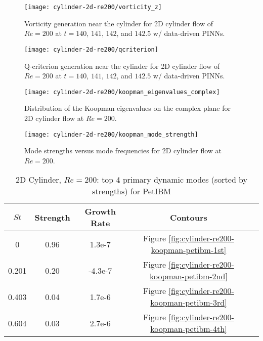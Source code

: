 \begin{figure}[!hbt]
    \centering%
    \texttt{[image: cylinder-2d-re200/vorticity\_z]}%
    \caption{%
        Vorticity generation near the cylinder for 2D cylinder flow of $Re=\num{200}$ at $t=140$, $141$, $142$, and $142.5$ w/ data-driven PINNs.
    }
    \label{fig:cylinder-re200-pinn-vort-gen}%
\end{figure}

\begin{figure}[!hbt]
    \centering%
    \texttt{[image: cylinder-2d-re200/qcriterion]}%
    \caption{%
        Q-criterion generation near the cylinder for 2D cylinder flow of $Re=\num{200}$ at $t=140$, $141$, $142$, and $142.5$ w/ data-driven PINNs.
    }
    \label{fig:cylinder-re200-pinn-qcriterion}%
\end{figure}

\begin{figure}[!hbt]
    \centering%
    \texttt{[image: cylinder-2d-re200/koopman\_eigenvalues\_complex]}%
    \caption{%
        Distribution of the Koopman eigenvalues on the complex plane for 2D cylinder flow at $Re=\num{200}$.
    }
    \label{fig:cylinder-re200-koopman-eig-dist}%
\end{figure}

\begin{figure}[!hbt]
    \centering%
    \texttt{[image: cylinder-2d-re200/koopman\_mode\_strength]}%
    \caption{%
        Mode strengths versus mode frequencies for 2D cylinder flow at $Re=\num{200}$.
    }
    \label{fig:cylinder-re200-koopman-mode-strength}%
\end{figure}

\begin{table}[hbt!]
    \begin{threeparttable}[b]
        \begin{tabular}{ccccc}
            \toprule
            $St$ & Strength & Growth Rate & Contours \\
            \midrule
            0     & 0.96 & 1.3e-7  & Figure \ref{fig:cylinder-re200-koopman-petibm-1st}\\
            0.201 & 0.20 & -4.3e-7 & Figure \ref{fig:cylinder-re200-koopman-petibm-2nd}\\
            0.403 & 0.04 & 1.7e-6  & Figure \ref{fig:cylinder-re200-koopman-petibm-3rd}\\
            0.604 & 0.03 & 2.7e-6  & Figure \ref{fig:cylinder-re200-koopman-petibm-4th}\\
            \bottomrule
        \end{tabular}%
        \caption{%
            2D Cylinder, $Re=200$: top 4 primary dynamic modes (sorted by strengths) for PetIBM%
        }%
        \label{table:koopman-petibm}
    \end{threeparttable}
\end{table}%

